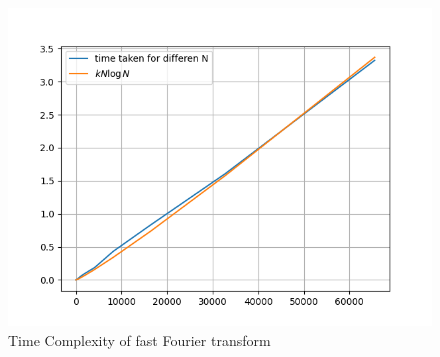 \documentclass[journal,12pt,twocolumn]{IEEEtran}
\begin{document}
\begin{figure}[H]
    \centering
    \includegraphics[width=\columnwidth]{plot/timeComplexity}
    \caption{Time Complexity of fast Fourier transform}
    \label{time Complexity of fast Fourier theorem}
\end{figure}
\end{document}
